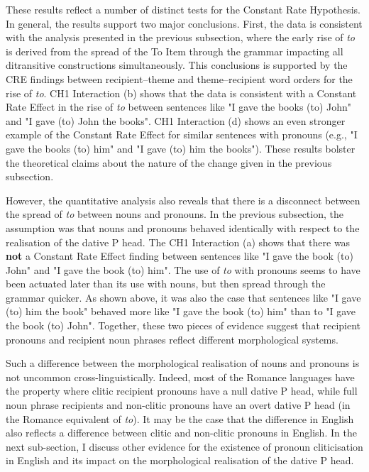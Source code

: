    These results reflect a number of distinct tests for the Constant Rate Hypothesis. In general, the results support two major conclusions. First, the data is consistent with the analysis presented in the previous subsection, where the early rise of \textit{to} is derived from the spread of the To Item through the grammar impacting all ditransitive constructions simultaneously. This conclusions is supported by the CRE findings between recipient--theme and theme--recipient word orders for the rise of \textit{to}. CH1 Interaction (b) shows that the data is consistent with a Constant Rate Effect in the rise of \textit{to} between sentences like "I gave the books (to) John" and "I gave (to) John the books". CH1 Interaction (d) shows an even stronger example of the Constant Rate Effect for similar sentences with pronouns (e.g., "I gave the books (to) him" and "I gave (to) him the books"). These results bolster the theoretical claims about the nature of the change given in the previous subsection.

   However, the quantitative analysis also reveals that there is a disconnect between the spread of \textit{to} between nouns and pronouns. In the previous subsection, the assumption was that nouns and pronouns behaved identically with respect to the realisation of the dative P head. The CH1 Interaction (a) shows that there was \textbf{not} a Constant Rate Effect finding between sentences like "I gave the book (to) John" and "I gave the book (to) him". The use of \textit{to} with pronouns seems to have been actuated later than its use with nouns, but then spread through the grammar quicker. As shown above, it was also the case that sentences like "I gave (to) him the book" behaved more like "I gave the book (to) him" than to "I gave the book (to) John". Together, these two pieces of evidence suggest that recipient pronouns and recipient noun phrases reflect different morphological systems.

   Such a difference between the morphological realisation of nouns and pronouns is not uncommon cross-linguistically. Indeed, most of the Romance languages have the property where clitic recipient pronouns have a null dative P head, while full noun phrase recipients and non-clitic pronouns have an overt dative P head (in the Romance equivalent of \textit{to}). It may be the case that the difference in English also reflects a difference between clitic and non-clitic pronouns in English. In the next sub-section, I discuss other evidence for the existence of pronoun cliticisation in English and its impact on the morphological realisation of the dative P head.
    

